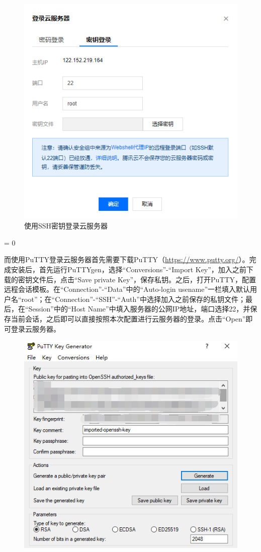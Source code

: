 \documentclass[a4paper,11pt]{ctexart}
\newcommand{\subpar}
{
	\par
	\hangafter = 0
	\setlength{\hangindent}{1em}
}
\begin{document}
\begin{spacing}{1.5}
\begin{figure}[h]
	\includegraphics[scale=0.4]{SSH3.png}
	\caption{使用SSH密钥登录云服务器}\label{figure:SSH23}
\end{figure}
\subpar
而使用PuTTY登录云服务器首先需要下载PuTTY（\url{https://www.putty.org/}）。完成安装后，首先运行PuTTYgen，选择“Conversions”-“Import Key”，加入之前下载的密钥文件后，点击“Save private Key”，保存私钥。之后，打开PuTTY，配置远程会话模板。在“Connection”-“Data”中的“Auto-login usename”一栏填入默认用户名“root”；在“Connection”-“SSH”-“Auth”中选择加入之前保存的私钥文件；最后，在“Session”中的“Host Name”中填入服务器的公网IP地址，端口选择22，并保存当前会话，之后即可以直接按照本次配置进行云服务器的登录。点击“Open”即可登录云服务器。
\begin{figure}[h]
	\centering
	\setlength{\abovecaptionskip}{2mm}
	\setlength{\belowcaptionskip}{-2mm}
	\includegraphics[scale=0.4]{PUTTY1.png}

\end{figure}
\end{spacing}
\end{document}

